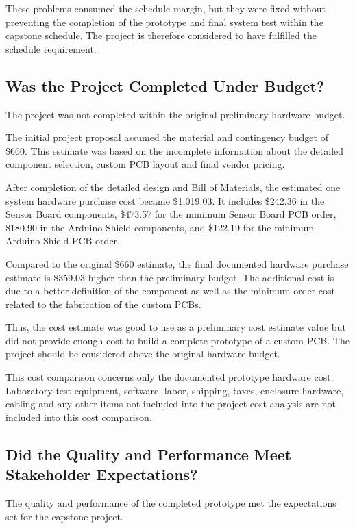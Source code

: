 These problems consumed the schedule margin, but they were fixed without preventing the completion of the prototype and final system test within the capstone schedule. The project is therefore considered to have fulfilled the schedule requirement.

\subsection{Was the Project Completed Under Budget?}

The project was not completed within the original preliminary hardware budget.

The initial project proposal assumed the material and contingency budget of \$660. This estimate was based on the incomplete information about the detailed component selection, custom PCB layout and final vendor pricing.

After completion of the detailed design and Bill of Materials, the estimated one system hardware purchase cost became \$1,019.03. It includes \$242.36 in the Sensor Board components, \$473.57 for the minimum Sensor Board PCB order, \$180.90 in the Arduino Shield components, and \$122.19 for the minimum Arduino Shield PCB order.

Compared to the original \$660 estimate, the final documented hardware purchase estimate is \$359.03 higher than the preliminary budget. The additional cost is due to a better definition of the component as well as the minimum order cost related to the fabrication of the custom PCBs.

Thus, the cost estimate was good to use as a preliminary cost estimate value but did not provide enough cost to build a complete prototype of a custom PCB. The project should be considered above the original hardware budget.

This cost comparison concerns only the documented prototype hardware cost. Laboratory test equipment, software, labor, shipping, taxes, enclosure hardware, cabling and any other items not included into the project cost analysis are not included into this cost comparison.

\subsection{Did the Quality and Performance Meet Stakeholder Expectations?}

The quality and performance of the completed prototype met the expectations set for the capstone project.

